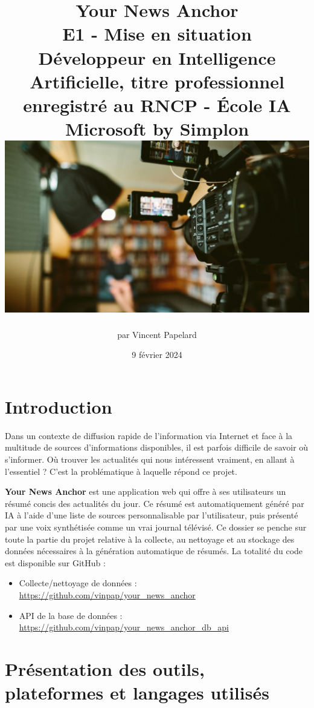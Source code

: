 \documentclass[french]{article}
\title{%
    \huge Your News Anchor  \\
    \bigskip
    \large E1 - Mise en situation \\ 
    Développeur en Intelligence Artificielle,
    titre professionnel enregistré au RNCP - École IA Microsoft by Simplon
    \vfill
    \includegraphics[width=14cm]{cover.jpg} 
    \vfill}
\date{9 février 2024}
\author{par Vincent Papelard}
\begin{document}
    \renewcommand{\contentsname}{Table des Matières}
    \maketitle
    \newpage
    \tableofcontents
    \newpage

    \section*{Introduction}
    Dans un contexte de diffusion rapide de l'information via Internet et face à la multitude de sources d'informations disponibles, il est parfois difficile de savoir où s'informer. Où trouver les actualités qui nous intéressent vraiment, en allant à l'essentiel ? C'est la problématique à laquelle répond ce projet.
    
    \textbf{Your News Anchor} est une application web qui offre à ses utilisateurs un résumé concis des actualités du jour. Ce résumé est automatiquement généré par IA à l'aide d'une liste de sources personnalisable par l'utilisateur, puis présenté par une voix synthétisée comme un vrai journal télévisé.
    Ce dossier se penche sur toute la partie du projet relative à la collecte, au nettoyage et au stockage des données nécessaires à la génération automatique de résumés.
    La totalité du code est disponible sur GitHub :
    \begin{itemize}
        \item Collecte/nettoyage de données : \url{https://github.com/vinpap/your_news_anchor}
        \item API de la base de données : \url{https://github.com/vinpap/your_news_anchor_db_api}
    \end{itemize}

    \section{Présentation des outils, plateformes et langages utilisés}
\end{document}
